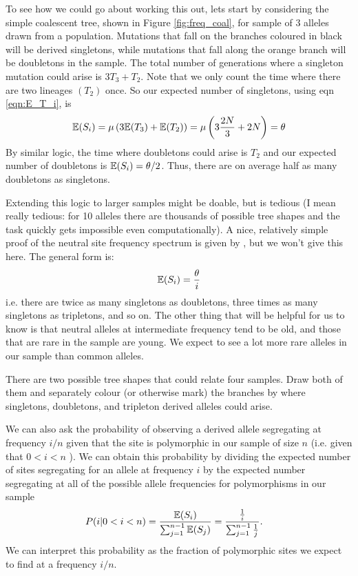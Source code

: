 To see how we could go about working this out, lets start by considering the simple coalescent tree, shown in Figure \ref{fig:freq_coal}, for sample of $3$ alleles drawn from a population. Mutations that fall on the
branches coloured in black will be derived singletons, while mutations that
fall along the orange branch will be doubletons in the sample. The
total number of generations where a singleton mutation could arise is
$3 T_3 + T_2$. Note that we only count the time where there are two
lineages $(T_{2})$ once. So our expected number of singletons, using eqn \eqref{eqn:E_T_i}, is 
\begin{equation}
\mathbb{E}(S_i) = \mu \left( 3\mathbb{E}(T_3) +  \mathbb{E}(T_2) \right) = \mu \left( 3
  \frac{2N}{3}+ 2N \right) = \theta
\end{equation}
By similar logic, the time where doubletons could arise is
$T_2$ and our expected number of doubletons is $\mathbb{E}(S_i)
=\theta/2$. Thus, there are on average half as many doubletons as singletons. 

Extending this logic to larger samples might be doable, but is tedious (I mean really tedious: for 10 alleles there are thousands of possible tree shapes and the task quickly gets impossible even computationally). A nice, relatively simple proof of the neutral site frequency spectrum is given by
\citeauthor{Hudson:15}, but we won't give this here. The general form is: 
\begin{equation}
\mathbb{E}(S_i) = \frac{\theta }{i}   \label{eqn:neutral_freq_spec}
\end{equation}
i.e. there are twice as many singletons as doubletons, three times as many
singletons as tripletons, and so on. The other thing that will be
helpful for us to know is that neutral alleles at intermediate frequency tend to be old, and those that are rare in the sample are young. We expect to see a lot more rare alleles in our sample than common alleles. 

\begin{question}
There are two possible tree shapes that could relate four
samples. Draw both of them and separately colour (or otherwise mark) the branches by where singletons, doubletons, and tripleton derived alleles could arise. 
\end{question}

We can also ask the probability of observing a derived allele segregating at frequency $i/n$ given that the site is polymorphic in our sample of size $n$ (i.e. given that $0<i<n$ ). We can obtain this probability by dividing the expected number of sites segregating for an allele at frequency $i$ by the expected number segregating at all of the possible allele frequencies for polymorphisms in our sample 
\begin{eqnarray}
P(i |0<i<n) &=\frac{\mathbb{E}(S_i)}{\sum_{j=1}^{n-1} \mathbb{E}(S_j)} = \frac{\frac{1}{i}}{\sum_{j=1}^{n-1} \frac{1}{j}}.
\end{eqnarray}
We can interpret this probability as the fraction of polymorphic sites we expect to find at a frequency $i/n$. 

